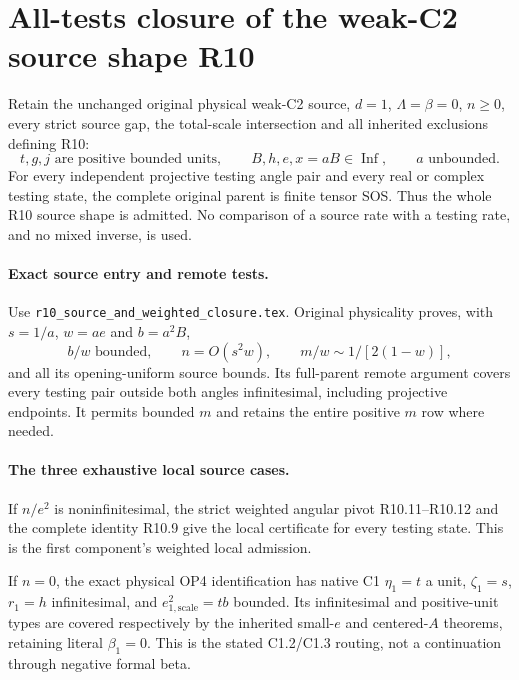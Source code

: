 \section{All-tests closure of the weak-C2 source shape R10}
\begin{theorem}
Retain the unchanged original physical weak-C2 source, $d=1$,
$\Lambda=\beta=0$, $n\ge0$, every strict source gap, the total-scale
intersection and all inherited exclusions defining R10:
\[
 t,g,j\text{ are positive bounded units},\qquad
 B,h,e,x=aB\in\operatorname{Inf},\qquad a\text{ unbounded}.
\]
For every independent projective testing angle pair and every real or
complex testing state, the complete original parent is finite tensor
SOS. Thus the whole R10 source shape is admitted. No comparison of a
source rate with a testing rate, and no mixed inverse, is used.
\end{theorem}

\paragraph{Exact source entry and remote tests.}
Use \texttt{r10\_source\_and\_weighted\_closure.tex}.
Original physicality proves, with $s=1/a$, $w=ae$ and $b=a^2B$,
\[
 b/w\text{ bounded},\qquad n=O(s^2w),\qquad
 m/w\sim1/[2(1-w)],
\]
and all its opening-uniform source bounds. Its full-parent remote
argument covers every testing pair outside both angles infinitesimal,
including projective endpoints. It permits bounded $m$ and retains
the entire positive $m$ row where needed.

\paragraph{The three exhaustive local source cases.}
If $n/e^2$ is noninfinitesimal, the strict weighted angular pivot
R10.11--R10.12 and the complete identity R10.9 give the local
certificate for every testing state. This is the first component's
weighted local admission.

If $n=0$, the exact physical OP4 identification has native C1
$\eta_1=t$ a unit, $\zeta_1=s$, $r_1=h$ infinitesimal, and
$e_{1,\mathrm{scale}}^2=tb$ bounded. Its infinitesimal and positive-unit
types are covered respectively by the inherited small-$e$ and
centered-$A$ theorems, retaining literal $\beta_1=0$.
This is the stated C1.2/C1.3 routing, not a continuation through
negative formal beta.

